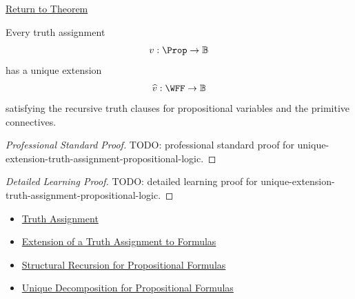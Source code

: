 \newpage
{}
\label{prf:unique-extension-truth-assignment-propositional-logic}

\begin{remark*}[Return]
\hyperref[thm:unique-extension-truth-assignment-propositional-logic]{Return to Theorem}
\end{remark*}

\begin{theorem*}
Every truth assignment
\[
v:\Prop\to\mathbb{B}
\]
has a unique extension
\[
\widehat v:\WFF\to\mathbb{B}
\]
satisfying the recursive truth clauses for propositional variables and the
primitive connectives.
\end{theorem*}

\begin{proof}[Professional Standard Proof]
\LRAProofBodyStart
TODO: professional standard proof for unique-extension-truth-assignment-propositional-logic.
\end{proof}

\begin{proof}[Detailed Learning Proof]
\LRAProofBodyStart
TODO: detailed learning proof for unique-extension-truth-assignment-propositional-logic.
\end{proof}

\begin{remark*}
\end{remark*}

\begin{dependencies}
\begin{itemize}
  \item \hyperref[def:truth-assignment-propositional-logic]{Truth Assignment}
  \item \hyperref[def:extended-truth-assignment-propositional-logic]{Extension of a Truth Assignment to Formulas}
  \item \hyperref[thm:structural-recursion-propositional-formulas]{Structural Recursion for Propositional Formulas}
  \item \hyperref[thm:unique-decomposition-propositional-formulas]{Unique Decomposition for Propositional Formulas}
\end{itemize}
\end{dependencies}

\clearpage
